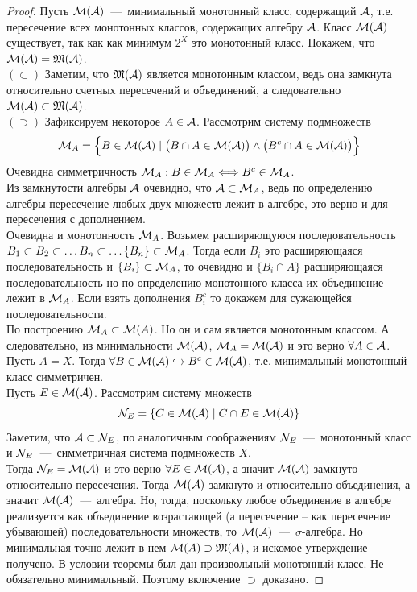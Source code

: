 \begin{proof}
    Пусть $\mathcal{M}(\mathcal{A})$~---~минимальный монотонный класс, содержащий $\mathcal{A}$, т.е. пересечение всех монотонных классов, содержащих алгебру $\mathcal{A}$. Класс $\mathcal{M}(\mathcal{A})$ существует, так как как минимум $2^X$ это монотонный класс. Покажем, что $\mathcal{M}(\mathcal{A}) = \mathfrak{M}(\mathcal{A})$. \\
    $(\subset)$ Заметим, что $\mathfrak{M}(\mathcal{A})$ является монотонным классом, ведь она замкнута относительно счетных пересечений и объединений, а следовательно $\mathcal{M}(\mathcal{A}) \subset \mathfrak{M}(\mathcal{A})$. \\
    $(\supset)$ Зафиксируем некоторое $A \in \mathcal{A}$. Рассмотрим систему подмножеств \[\mathcal{M}_A = \Big\{B \in \mathcal{M}(\mathcal{A}) \mid \big(B \cap A \in \mathcal{M}(\mathcal{A})\big) \wedge \big(B^c \cap A \in \mathcal{M}(\mathcal{A}) \big) \Big\}\]
    Очевидна симметричность $\mathcal{M}_A: B \in \mathcal{M}_A \Longleftrightarrow B^c \in \mathcal{M}_A$.\\
    Из замкнутости алгебры $\mathcal{A}$ очевидно, что $\mathcal{A} \subset \mathcal{M}_A$, ведь по определению алгебры пересечение любых двух множеств лежит в алгебре, это верно и для пересечения с дополнением.\\
    Очевидна и монотонность $\mathcal{M}_A$. Возьмем расширяющуюся последовательность $B_1 \subset B_2 \subset \ldots B_n \subset \ldots \{ B_n \} \subset \mathcal{M}_A$. Тогда если $B_i$ это расширяющаяся последовательность и $\{B_i\} \subset \mathcal{M}_A$, то очевидно и $\{B_i \cap A\}$ расширяющаяся последовательность но по определению монотонного класса их объединение лежит в $\mathcal{M}_A$. Если взять дополнения $B_i^c$ то докажем для сужающейся последовательности.\\
    По построению $\mathcal{M}_A \subset\mathcal{M}(A)$. Но он и сам является монотонным классом. А следовательно, из минимальности $\mathcal{M}(\mathcal{A})$, $\mathcal{M}_A = \mathcal{M}(\mathcal{A})$ и это верно $\forall A \in \mathcal{A}$.\\
    Пусть $A = X$. Тогда $\forall B \in \mathcal{M}(\mathcal{A}) \hookrightarrow B^c \in \mathcal{M}(\mathcal{A})$, т.е. минимальный монотонный класс симметричен. \\
    Пусть $E \in \mathcal{M}(\mathcal{A})$. Рассмотрим систему множеств \[\mathcal{N}_E = \{C \in \mathcal{M}(\mathcal{A}) \mid C \cap E \in \mathcal{M}(\mathcal{A})\}\]
    Заметим, что $\mathcal{A} \subset \mathcal{N}_E$, по аналогичным соображениям $\mathcal{N}_E$~---~монотонный класс и $\mathcal{N}_E$~---~симметричная система подмножеств $X$.\\
    Тогда $\mathcal{N}_E = \mathcal{M}(\mathcal{A})$ и это верно $\forall E \in \mathcal{M}(\mathcal{A})$, а значит $\mathcal{M}(\mathcal{A})$ замкнуто относительно пересечения. Тогда $\mathcal{M}(\mathcal{A})$ замкнуто и относительно объединения, а значит $\mathcal{M}(\mathcal{A})$~---~алгебра. Но, тогда, поскольку любое объединение в алгебре реализуется как объединение возрастающей (а пересечение -- как пересечение убывающей) последовательности множеств, то $\mathcal{M}(\mathcal{A})$~---~$\sigma$-алгебра. Но минимальная точно лежит в нем $\mathcal{M}(A) \supset \mathfrak{M}(A)$, и искомое утверждение получено. В условии теоремы был дан произвольный монотонный класс. Не обязательно минимальный. Поэтому включение $\supset$ доказано.
\end{proof}
